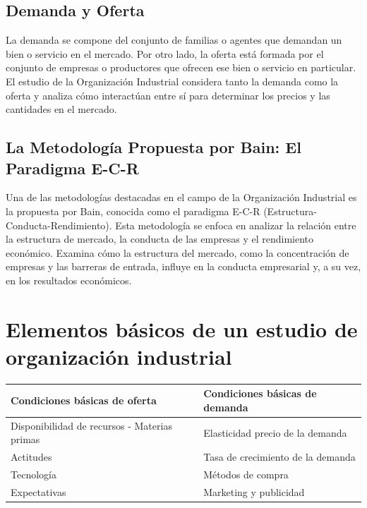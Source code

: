 \documentclass[
  doc,
  floatsintext,
  longtable,
  a4paper,
  nolmodern,
  notxfonts,
  notimes,
  colorlinks=true,linkcolor=blue,citecolor=blue,urlcolor=blue]{apa7}
\begin{document}
\subsection{Demanda y Oferta}\label{demanda-y-oferta}

La demanda se compone del conjunto de familias o agentes que demandan un
bien o servicio en el mercado. Por otro lado, la oferta está formada por
el conjunto de empresas o productores que ofrecen ese bien o servicio en
particular. El estudio de la Organización Industrial considera tanto la
demanda como la oferta y analiza cómo interactúan entre sí para
determinar los precios y las cantidades en el mercado.

\subsection{La Metodología Propuesta por Bain: El Paradigma
E-C-R}\label{la-metodologuxeda-propuesta-por-bain-el-paradigma-e-c-r}

Una de las metodologías destacadas en el campo de la Organización
Industrial es la propuesta por Bain, conocida como el paradigma E-C-R
(Estructura-Conducta-Rendimiento). Esta metodología se enfoca en
analizar la relación entre la estructura de mercado, la conducta de las
empresas y el rendimiento económico. Examina cómo la estructura del
mercado, como la concentración de empresas y las barreras de entrada,
influye en la conducta empresarial y, a su vez, en los resultados
económicos.

\section{Elementos básicos de un estudio de organización
industrial}\label{elementos-buxe1sicos-de-un-estudio-de-organizaciuxf3n-industrial}

\begin{longtable}[]{@{}
  >{\raggedright\arraybackslash}p{}
  >{\raggedright\arraybackslash}p{}@{}}
\toprule\noalign{}
\begin{minipage}[b]{\linewidth}\raggedright
Condiciones básicas de oferta
\end{minipage} & \begin{minipage}[b]{\linewidth}\raggedright
Condiciones básicas de demanda
\end{minipage} \\
\midrule\noalign{}
\endhead
\bottomrule\noalign{}
\endlastfoot
Disponibilidad de recursos - Materias primas & Elasticidad precio de la
demanda \\
Actitudes & Tasa de crecimiento de la demanda \\
Tecnología & Métodos de compra \\
Expectativas & Marketing y publicidad \\
\end{longtable}
\end{document}
